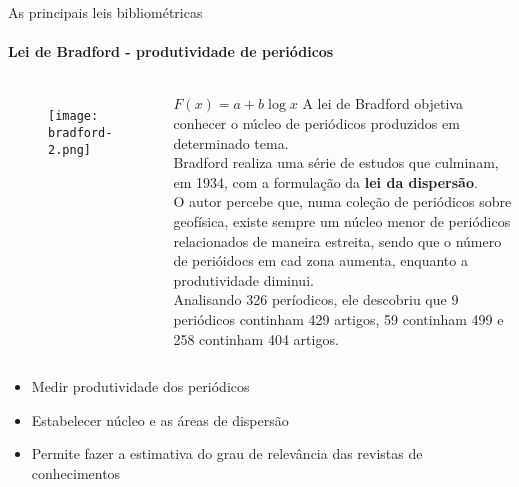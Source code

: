 \begin{frame}[t]{As principais leis bibliométricas}
    \framesubtitle{Lei de Bradford - produtividade de periódicos}



    \begin{columns}

        \begin{figure}
            \texttt{[image: bradford-2.png]}
        \end{figure}

        \centering
        $F(x) = a + b \log x$
        A lei de Bradford objetiva conhecer o núcleo de periódicos produzidos em determinado tema.\\
        \scriptsize{
            Bradford realiza uma série de estudos que culminam, em 1934, com a formulação da \textbf{lei da dispersão}.\\
            O autor percebe que, numa coleção de periódicos sobre geofísica, existe sempre um núcleo menor de periódicos relacionados de maneira estreita, sendo que o número de perióidocs em cad zona aumenta, enquanto a produtividade diminui.\\
            Analisando 326 períodicos, ele descobriu que 9 periódicos continham 429 artigos, 59 continham 499 e 258 continham 404 artigos.
        }
    \end{columns}

    \vspace*{0.2cm}
    \begin{itemize}
        \item Medir produtividade dos periódicos
        \item Estabelecer núcleo e as áreas de dispersão
        \item Permite fazer a estimativa do grau de relevância das revistas de conhecimentos
    \end{itemize}
\end{frame}
